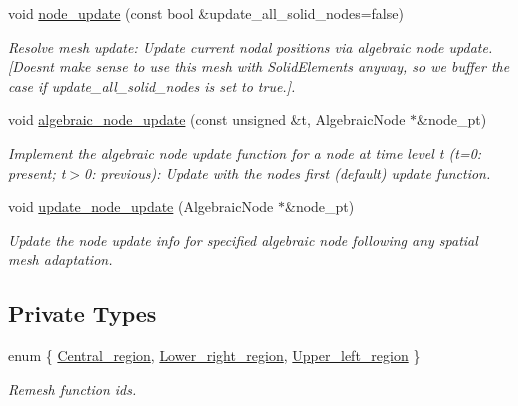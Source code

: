 \begin{DoxyCompactItemize}
void \hyperlink{classoomph_1_1AlgebraicRefineableQuarterTubeMesh_af521c0a76cf0bd14692979bd7747507d}{node\+\_\+update} (const bool \&update\+\_\+all\+\_\+solid\+\_\+nodes=false)
\begin{DoxyCompactList}\small\item\em Resolve mesh update\+: Update current nodal positions via algebraic node update. \mbox{[}Doesn\textquotesingle{}t make sense to use this mesh with Solid\+Elements anyway, so we buffer the case if update\+\_\+all\+\_\+solid\+\_\+nodes is set to true.\mbox{]}. \end{DoxyCompactList}\item 
void \hyperlink{classoomph_1_1AlgebraicRefineableQuarterTubeMesh_af98a0aaff29c54ffa35f72f7dcf6b8c7}{algebraic\+\_\+node\+\_\+update} (const unsigned \&t, Algebraic\+Node $\ast$\&node\+\_\+pt)
\begin{DoxyCompactList}\small\item\em Implement the algebraic node update function for a node at time level t (t=0\+: present; t$>$0\+: previous)\+: Update with the node\textquotesingle{}s first (default) update function. \end{DoxyCompactList}\item 
void \hyperlink{classoomph_1_1AlgebraicRefineableQuarterTubeMesh_a7ed9f4ce0442a6f962a1561318542a67}{update\+\_\+node\+\_\+update} (Algebraic\+Node $\ast$\&node\+\_\+pt)
\begin{DoxyCompactList}\small\item\em Update the node update info for specified algebraic node following any spatial mesh adaptation. \end{DoxyCompactList}\end{DoxyCompactItemize}
\subsection*{Private Types}
\begin{DoxyCompactItemize}
\item 
enum \{ \hyperlink{classoomph_1_1AlgebraicRefineableQuarterTubeMesh_a0e907476508fe47206036f48848f5fc4a516de7eb4676b7b88ebd50f5967a5579}{Central\+\_\+region}, 
\hyperlink{classoomph_1_1AlgebraicRefineableQuarterTubeMesh_a0e907476508fe47206036f48848f5fc4a05c833cf7edf44c3bd94251628400da3}{Lower\+\_\+right\+\_\+region}, 
\hyperlink{classoomph_1_1AlgebraicRefineableQuarterTubeMesh_a0e907476508fe47206036f48848f5fc4a4e534010f6f42e81a575935509ace9ab}{Upper\+\_\+left\+\_\+region}
 \}\begin{DoxyCompactList}\small\item\em Remesh function ids. \end{DoxyCompactList}
\end{DoxyCompactItemize}
